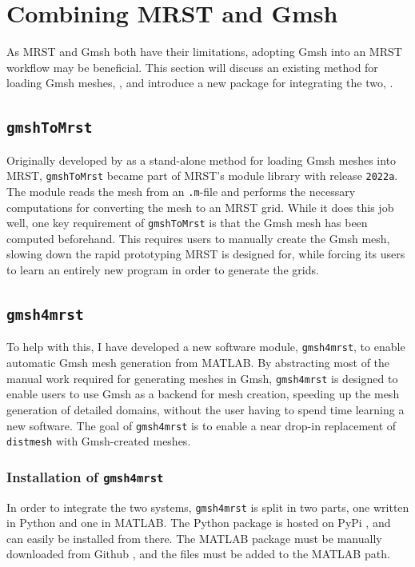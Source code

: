 \section{Combining MRST and Gmsh}
\label{sec:combining}
As MRST and Gmsh both have their limitations, adopting Gmsh into an MRST workflow may be beneficial. This section will discuss an existing method for loading Gmsh meshes, , and introduce a new package for integrating the two, .

\subsection{\texttt{gmshToMrst}}
\label{sec:GmshToMRST}
Originally developed by \textcite{gmsh_to_mrst} as a stand-alone method for loading Gmsh meshes into MRST, \verb|gmshToMrst| became part of MRST's module library with release \verb|2022a|. The module reads the mesh from an \verb|.m|-file and performs the necessary computations for converting the mesh to an MRST grid. While it does this job well, one key requirement of \verb|gmshToMrst| is that the Gmsh mesh has been computed beforehand. This requires users to manually create the Gmsh mesh, slowing down the rapid prototyping MRST is designed for, while forcing its users to learn an entirely new program in order to generate the grids.


\subsection{\texttt{gmsh4mrst}}
\label{sec:own_software}
To help with this, I have developed a new software module, \verb|gmsh4mrst|, to enable automatic Gmsh mesh generation from MATLAB. By abstracting most of the manual work required for generating meshes in Gmsh, \verb|gmsh4mrst| is designed to enable users to use Gmsh as a backend for mesh creation, speeding up the mesh generation of detailed domains, without the user having to spend time learning a new software. The goal of \verb|gmsh4mrst| is to enable a near drop-in replacement of \verb|distmesh| with Gmsh-created meshes.


\subsubsection{Installation of \texttt{gmsh4mrst}}
In order to integrate the two systems, \verb|gmsh4mrst| is split in two parts, one written in Python and one in MATLAB. The Python package is hosted on PyPi \cite{gmsh4mrst}, and can easily be installed from there. The MATLAB package must be manually downloaded from Github \cite{gmsh4mrst-github}, and the files must be added to the MATLAB path.

